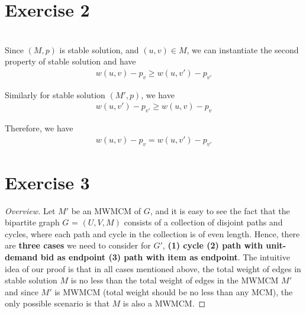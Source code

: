 \documentclass[11pt,a4paper]{article}
\begin{document}
\newpage
\section{Exercise 2}
 \\

    Since $(M, p)$ is stable solution, and $(u,v) \in M$, we can instantiate
    the second property of stable solution and have
    \begin{align}
        w(u,v) - p_v \geq w(u,v') - p_{v'}
    \end{align}

    Similarly for stable solution $(M', p)$, we have
    \begin{align}
        w(u,v') - p_{v'} \geq w(u,v) - p_{v}
    \end{align}

    Therefore, we have
    \begin{align}
        w(u,v) - p_v = w(u,v') - p_{v'}
    \end{align}

\newpage
\section{Exercise 3}

\begin{proof}[Overview]
    Let $M'$ be an MWMCM of $G$, and it is easy to see the fact that the bipartite graph
    $G$ = $(U,V,M)$ consists of a collection of disjoint paths and cycles,
    where each path and cycle in the collection is of even length. Hence,
    there are {\bf three cases} we need to consider for $G'$, {\bf (1) cycle (2) path with
    unit-demand bid as endpoint (3) path with item as endpoint}. The intuitive
    idea of our proof is that in all cases mentioned above, the total weight
    of edges in stable solution $M$ is no less than the total weight of edges
    in the MWMCM $M'$ and since $M'$ is MWMCM (total weight should be no less
    than any MCM), the only possible scenario is that $M$ is also a MWMCM. 

\end{proof}
\end{document}
